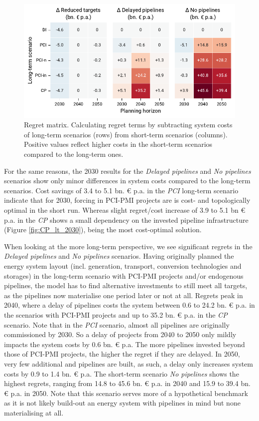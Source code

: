 \documentclass[preprint,12pt,sort&compress]{elsarticle}
\begin{document}
\begin{figure}[htbp]
  \centering
  \includegraphics[width=\textwidth]{regret_matrix}
  \caption{Regret matrix. Calculating regret terms by subtracting system costs of long-term scenarios (rows) from short-term scenarios (columns). Positive values reflect higher costs in the short-term scenarios compared to the long-term ones.}
  \label{fig:regret_matrix_results}
\end{figure}

For the same reasons, the 2030 results for the \textit{Delayed pipelines} and \textit{No pipelines} scenarios show only minor differences in system costs compared to the long-term scenarios. Cost savings of 3.4 to 5.1 bn. \euro{} p.a. in the \textit{PCI} long-term scenario indicate that for 2030, forcing in PCI-PMI projects are is cost- and topologically optimal in the short run. Whereas slight regret/cost increase of 3.9 to 5.1 bn \euro{} p.a. in the \textit{CP} shows a small dependency on the invested pipeline infrastructure (Figure \ref{fig:CP_lt_2030}), being the most cost-optimal solution.

When looking at the more long-term perspective, we see significant regrets in the \textit{Delayed pipelines} and \textit{No pipelines} scenarios. Having originally planned the energy system layout (incl. generation, transport, conversion technologies and storages) in the long-term scenario with PCI-PMI projects and/or endogenous pipelines, the model has to find alternative investments to still meet all targets, as the pipelines now materialise one period later or not at all. Regrets peak in 2040, where a delay of pipelines costs the system between 0.6 to 24.2 bn. \euro{} p.a. in the scenarios with PCI-PMI projects and up to 35.2 bn. \euro{} p.a. in the \textit{CP} scenario. 
Note that in the \textit{PCI} scenario, almost all pipelines are originally commissioned by 2030. So a delay of projects from 2040 to 2050 only mildly impacts the system costs by 0.6 bn. \euro{} p.a. The more pipelines invested beyond those of PCI-PMI projects, the higher the regret if they are delayed. In 2050, very few additional  and  pipelines are built, as such, a delay only increases system costs by 0.9 to 1.4 bn. \euro{} p.a. 
The short-term scenario \textit{No pipelines} shows the highest regrets, ranging from 14.8 to 45.6 bn. \euro{} p.a. in 2040 and 15.9 to 39.4 bn. \euro{} p.a. in 2050. Note that this scenario serves more of a hypothetical benchmark as it is not likely build-out an energy system with pipelines in mind but none materialising at all.
\end{document}
